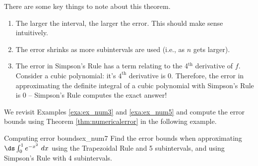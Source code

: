 
There are some key things to note about this theorem.
\begin{enumerate}
	\item		The larger the interval, the larger the error. This should make sense intuitively.
	\item		The error shrinks as more subintervals are used (i.e., as $n$ gets larger).  
	\item		The error in Simpson's Rule has a term relating to the 4$^{\text{th}}$ derivative of $f$. Consider a cubic polynomial: it's $4^{\text{th}}$ derivative is 0. Therefore, the error in approximating the definite integral of a cubic polynomial with Simpson's Rule is 0 -- Simpson's Rule computes the exact answer!
	\end{enumerate}

We revisit Examples \ref{exa:ex_num3} and \ref{exa:ex_num5} and compute the error bounds using Theorem \ref{thm:numericalerror} in the following example.\\


\begin{example}{Computing error bounds}{ex_num7}{
Find the error bounds when approximating $\ds \int_0^1 e^{-x^2}\ dx$ using the Trapezoidal Rule and 5 subintervals, and using Simpson's Rule with 4 subintervals.}
\end{example}

